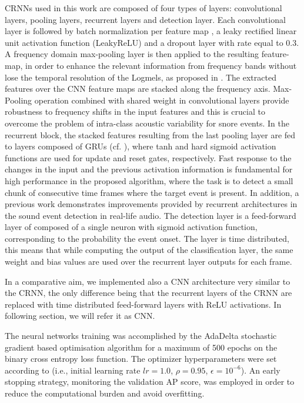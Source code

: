 CRNNs used in this work are composed of four types of layers: convolutional layers, pooling layers, recurrent layers and detection layer. 
Each convolutional layer is followed by batch normalization per feature map \cite{ioffe2015batch}, a leaky rectified linear unit activation function (LeakyReLU) and a dropout layer \cite{srivastava2014dropout} with rate equal to $0.3$.
A frequency domain max-pooling layer is then applied to the resulting feature-map, in order to enhance the relevant information from frequency bands without lose the temporal resolution of the Logmels, as proposed in \cite{cakirconvolutional}. The extracted features over the CNN feature maps are stacked along the frequency axis. Max-Pooling operation combined with shared weight in convolutional layers provide robustness to frequency shifts in the input features and this is crucial to overcome the problem of intra-class acoustic variability for snore events.
In the recurrent block, the stacked features resulting from the last pooling layer are fed to layers composed of GRUs (cf. ), where tanh and hard sigmoid activation functions are used for update and reset gates, respectively.
Fast response to the changes in the input and the previous activation information is fundamental for high performance in the proposed algorithm, where the task is to detect a small chunk of consecutive time frames where the target event is present. In addition, a previous work \cite{valenti2017neural} demonstrates improvements provided by recurrent architectures in the sound event detection in real-life audio.
The detection layer is a feed-forward layer of composed of a single neuron with sigmoid activation function, corresponding to the probability the event onset. The layer is time distributed, this means that while computing the output of the classification layer, the same weight and bias values are used over the recurrent layer outputs for each frame.

In a comparative aim, we implemented also a CNN architecture very similar to the CRNN, the only difference being that the recurrent layers of the CRNN are replaced with time distributed feed-forward layers with ReLU activations. In following section, we will refer it as CNN.


The neural networks training was accomplished by the AdaDelta stochastic gradient based optimisation algorithm \cite{zeiler2012adadelta} for a maximum of 500 epochs on the binary cross entropy loss function. The optimizer hyperparameters were set according to \cite{zeiler2012adadelta} (i.e., initial learning rate $lr=1.0$, $\rho=0.95$, $\epsilon=10^{-6}$). An early stopping strategy, monitoring the validation AP score, was employed in order to reduce the computational burden and avoid overfitting. 


